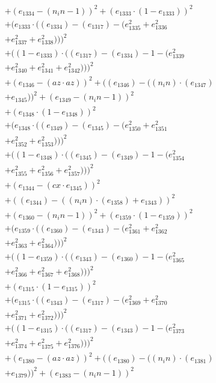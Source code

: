\documentclass[10pt, a4paper]{article}
\begin{document}
\begin{small}
\begin{align*}
& + (e_{1334} - (n_in - 1))^{2} + (e_{1333}  \cdot  (1 - e_{1333}))^{2} \\
& + (e_{1333}  \cdot  ((e_{1334}) - (e_{1317}) - (e_{1335}^{2} + e_{1336}^{2} \\
& + e_{1337}^{2} + e_{1338}^{2})))^{2} \\
& + ((1 - e_{1333})  \cdot  ((e_{1317}) - (e_{1334}) - 1 - (e_{1339}^{2} \\
& + e_{1340}^{2} + e_{1341}^{2} + e_{1342}^{2})))^{2} \\
& + (e_{1346} - (az  \cdot  az))^{2} + ((e_{1346}) - ((n_in)  \cdot  (e_{1347}) \\
& + e_{1345}))^{2} + (e_{1349} - (n_in - 1))^{2} \\
& + (e_{1348}  \cdot  (1 - e_{1348}))^{2} \\
& + (e_{1348}  \cdot  ((e_{1349}) - (e_{1345}) - (e_{1350}^{2} + e_{1351}^{2} \\
& + e_{1352}^{2} + e_{1353}^{2})))^{2} \\
& + ((1 - e_{1348})  \cdot  ((e_{1345}) - (e_{1349}) - 1 - (e_{1354}^{2} \\
& + e_{1355}^{2} + e_{1356}^{2} + e_{1357}^{2})))^{2} \\
& + (e_{1344} - (cx  \cdot  e_{1345}))^{2} \\
& + ((e_{1344}) - ((n_in)  \cdot  (e_{1358}) + e_{1343}))^{2} \\
& + (e_{1360} - (n_in - 1))^{2} + (e_{1359}  \cdot  (1 - e_{1359}))^{2} \\
& + (e_{1359}  \cdot  ((e_{1360}) - (e_{1343}) - (e_{1361}^{2} + e_{1362}^{2} \\
& + e_{1363}^{2} + e_{1364}^{2})))^{2} \\
& + ((1 - e_{1359})  \cdot  ((e_{1343}) - (e_{1360}) - 1 - (e_{1365}^{2} \\
& + e_{1366}^{2} + e_{1367}^{2} + e_{1368}^{2})))^{2} \\
& + (e_{1315}  \cdot  (1 - e_{1315}))^{2} \\
& + (e_{1315}  \cdot  ((e_{1343}) - (e_{1317}) - (e_{1369}^{2} + e_{1370}^{2} \\
& + e_{1371}^{2} + e_{1372}^{2})))^{2} \\
& + ((1 - e_{1315})  \cdot  ((e_{1317}) - (e_{1343}) - 1 - (e_{1373}^{2} \\
& + e_{1374}^{2} + e_{1375}^{2} + e_{1376}^{2})))^{2} \\
& + (e_{1380} - (az  \cdot  az))^{2} + ((e_{1380}) - ((n_in)  \cdot  (e_{1381}) \\
& + e_{1379}))^{2} + (e_{1383} - (n_in - 1))^{2} \\

\end{align*}
\end{small}
\end{document}
